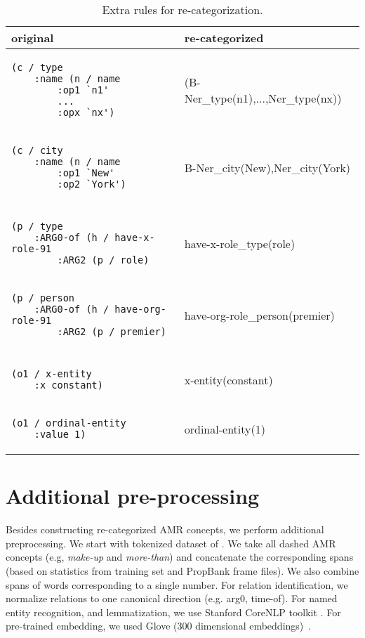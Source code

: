 \documentclass[11pt,a4paper]{article}
\begin{document}
\begin{table*}[ht!] \small 
    \begin{center} 
        \begin{tabular}{ll} 
            \hline  original    &  re-categorized \\  \hline
            
            \begin{lstlisting}
(c / type
    :name (n / name
        :op1 `n1'
        ...
        :opx `nx')
\end{lstlisting}& (B-Ner\_type(n1),...,Ner\_type(nx))\\ 
            \begin{lstlisting}
(c / city
    :name (n / name
        :op1 `New'
        :op2 `York')
\end{lstlisting}& B-Ner\_city(New),Ner\_city(York)\\ 
\hline \\
            \begin{lstlisting}
(p / type
    :ARG0-of (h / have-x-role-91
        :ARG2 (p / role)
\end{lstlisting}& have-x-role\_type(role)\\ 
            \begin{lstlisting}
(p / person
    :ARG0-of (h / have-org-role-91
        :ARG2 (p / premier)
\end{lstlisting}& {have-org-role\_person(premier)}\\ 
\hline\\
            \begin{lstlisting}
(o1 / x-entity
    :x constant)
\end{lstlisting}& x-entity(constant)\\ 
            \begin{lstlisting}
(o1 / ordinal-entity
    :value 1)
\end{lstlisting}&  ordinal-entity(1)\\ 
\hline
            \hline
        \end{tabular}
    \end{center}
	\caption{\label{table:det} Extra rules for re-categorization.  }
\end{table*}

\section{Additional pre-processing}

Besides constructing re-categorized AMR concepts, we perform additional preprocessing. We start with tokenized dataset of \citet{Pourdamghani2014AligningES}. We take all dashed AMR concepts (e.g, {\it make-up} and {\it more-than}) and concatenate the corresponding spans (based on statistics from training set and PropBank frame files). We also combine spans of words corresponding to a single number. For relation identification, we normalize relations to one canonical direction (e.g. arg0, time-of).
For named entity recognition, and lemmatization, we use Stanford CoreNLP toolkit \cite{manning-EtAl:2014:P14-5}. For pre-trained embedding, we used Glove (300 dimensional embeddings)~\cite{pennington2014glove}.  
\end{document}
